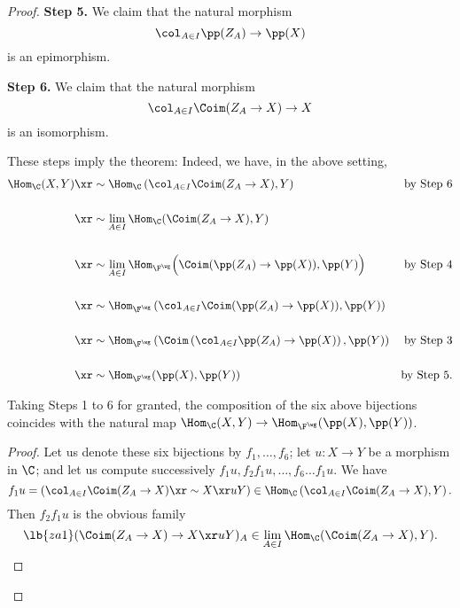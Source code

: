 \documentclass[12pt]{article}
\theoremstyle{remark}
\theoremstyle{definition}
\begin{document}
\begin{proof}
\nn\textbf{Step 5.} We claim that the natural morphism 
$$
\col_{A\in I}\pp(Z_A)\to\pp(X) 
$$ 
is an epimorphism.

\nn\textbf{Step 6.} We claim that the natural morphism 
$$
\col_{A\in I}\Coim(Z_A\to X)\to X
$$ 
is an isomorphism.

These steps imply the theorem: Indeed, we have, in the above setting, 
\begin{align*} 
\Hom_\C(X,Y)&\xr\sim\Hom_\C\left(\col_{A\in I}\Coim(Z_A\to X),Y\right)&\text{by Step 6}\\ \\ 
&\xr\sim\lim_{A\in I}\Hom_\C(\Coim(Z_A\to X),Y)\\ \\ 
&\xr\sim\lim_{A\in I}\Hom_{\F^\wg}\Big(\Coim(\pp(Z_A)\to\pp(X)),\pp(Y)\Big)&\text{by Step 4}\\ \\ 
&\xr\sim\Hom_{\F^\wg}\left(\col_{A\in I}\Coim(\pp(Z_A)\to\pp(X)),\pp(Y)\right)\\ \\ 
&\xr\sim\Hom_{\F^\wg}\left(\Coim\left(\col_{A\in I}\pp(Z_A)\to\pp(X)\right),\pp(Y)\right)&\text{by Step 3}\\ \\ 
&\xr\sim\Hom_{\F^\wg}(\pp(X),\pp(Y))&\text{by Step 5.}
\end{align*} 

\begin{lem} 
Taking Steps 1 to 6 for granted, the composition of the six above bijections coincides with the natural map $\Hom_\C(X,Y)\to\Hom_{\F^\wg}(\pp(X),\pp(Y))$.  
\end{lem}

\begin{proof}
Let us denote these six bijections by $f_1,\dots,f_6$; let $u:X\to Y$ be a morphism in $\C$; and let us compute successively $f_1u,f_2f_1u,\dots,f_6\dots f_1u$. We have 
$$
f_1u=\left(\col_{A\in I}\Coim(Z_A\to X)\xr\sim X\xr uY\right)\in\Hom_\C\left(\col_{A\in I}\Coim(Z_A\to X),Y\right).
$$ 
Then $f_2f_1u$ is the obvious family 
\begin{equation}\lb{za1}
(\Coim(Z_A\to X)\to X\xr uY)_A\in\lim_{A\in I}\Hom_\C(\Coim(Z_A\to X),Y).
\end{equation}


\end{proof}
\end{proof}
\end{document}
